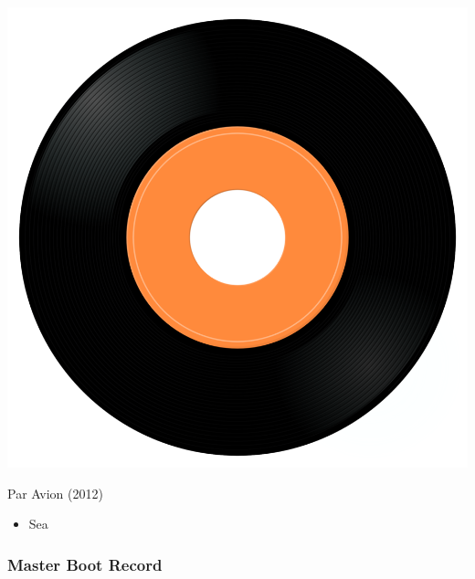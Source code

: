 \begin{minipage}[t]{0.25\textwidth}
\captionsetup{type=figure}
\includegraphics[width=\textwidth]{Images/cover.png}
\caption*{Par Avion (2012)}
\end{minipage}
\begin{minipage}[t]{0.25\textwidth}\vspace{0pt}
\begin{itemize}[nosep,leftmargin=1em,labelwidth=*,align=left]
	\setlength{\itemsep}{0pt}
	\item Sea
\end{itemize}
\end{minipage}

\subsubsection{Master Boot Record}

